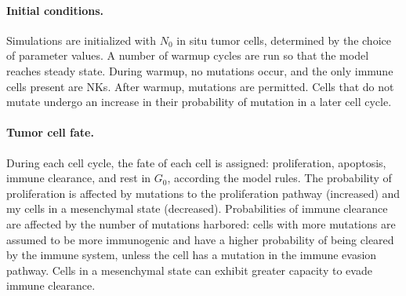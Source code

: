 \documentclass[11pt]{article}
\begin{document}
\paragraph{Initial conditions.}
Simulations are initialized with $N_0$ in situ tumor cells, determined by the choice of parameter values. A number of warmup cycles are run so that the model reaches steady state.
During warmup, no mutations occur, and the only immune cells present are NKs.
After warmup, mutations are permitted. Cells that do not mutate undergo an increase in their probability of mutation in a later cell cycle.

\paragraph{Tumor cell fate.}
During each cell cycle, the fate of each cell is assigned: proliferation, apoptosis, immune clearance, and rest in $G_0$, according the model rules. The probability of proliferation is affected by mutations to the proliferation pathway (increased) and my cells in a mesenchymal state (decreased). Probabilities of immune clearance are affected by the number of mutations harbored: cells with more mutations are assumed to be more immunogenic and have a higher probability of being cleared by the immune system, unless the cell has a mutation in the immune evasion pathway. Cells in a mesenchymal state can exhibit greater capacity to evade immune clearance.

\end{document}
